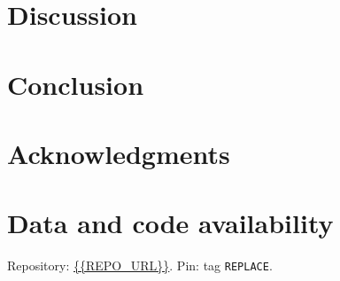 \documentclass[11pt,a4paper]{article}
\begin{document}
\section{Discussion}
\label{sec:disc}

\section{Conclusion}
\label{sec:conc}

\section*{Acknowledgments}

\section*{Data and code availability}
Repository: \url{{{REPO_URL}}}. Pin: tag \texttt{REPLACE}.




\end{document}
